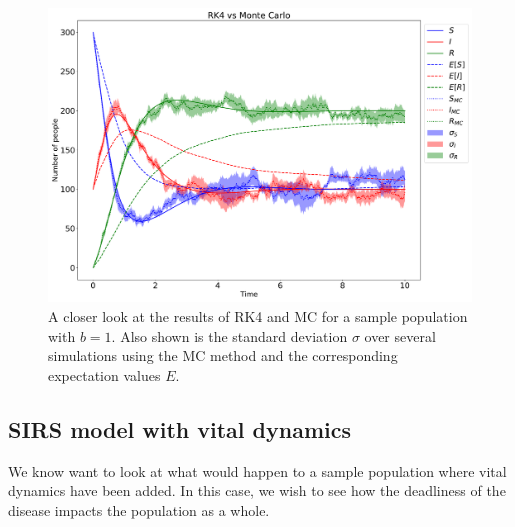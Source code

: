 \documentclass[../main.tex]{subfiles}
\begin{document}

\begin{figure}[!htb]
\centering
\includegraphics[width=\textwidth]{../figures/RK4_vs_MC.pdf}
\caption{A closer look at the results of RK4 and MC for a sample population with $b = 1$. Also shown is the standard deviation $\sigma$ over several simulations using the MC method and the corresponding expectation values $E$.}
\label{fig:mc:comparison}
\end{figure}



\subsection{SIRS model with vital dynamics}
We know want to look at what would happen to a sample population where vital dynamics have been added. In this case, we wish to see how the deadliness of the disease impacts the population as a whole. 
\end{document}
